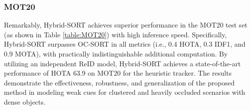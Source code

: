 \documentclass[letterpaper]{article} \usepackage{aaai23}  \usepackage{times}  \usepackage{helvet}  \usepackage{courier}  \usepackage[hyphens]{url}  \usepackage{graphicx} \urlstyle{rm} \def\UrlFont{\rm}  \usepackage{natbib}  \usepackage{caption} \frenchspacing  \setlength{\pdfpagewidth}{8.5in}  \setlength{\pdfpageheight}{11in}  \usepackage{algorithm}
\begin{document}
\subsubsection{MOT20}
Remarkably, Hybrid-SORT achieves superior performance in the MOT20 test set (as shown in Table \ref{table:MOT20}) with high inference speed. Specifically, Hybrid-SORT surpasses OC-SORT in all metrics (i.e., 0.4 HOTA, 0.3 IDF1, and 0.9 MOTA), with practically indistinguishable additional computation. By utilizing an independent ReID model, Hybrid-SORT achieves a state-of-the-art performance of HOTA 63.9 on MOT20 for the heuristic tracker. The results demonstrate the effectiveness, robustness, and generalization of the proposed method in modeling weak cues for clustered and heavily occluded scenarios with dense objects. 

\begin{table*}
\begin{center}
\caption{Results on MOT20-test with the private detections. Methods in the blue blocks share the same detections. The top three results with heuristic matcher were highlighted in the order of \textcolor{red}{red}, \textcolor{blue}{blue}, and \textcolor{green}{green}, respectively.}
\label{table:MOT20}
\end{center}
\end{table*}
\end{document}
